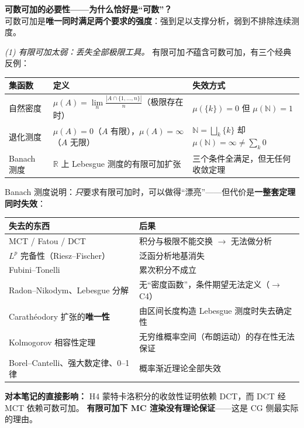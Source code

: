 \textbf{可数可加的必要性——为什么恰好是“可数”？}\\
可数可加是\textbf{唯一同时满足两个要求的强度}：强到足以支撑分析，弱到不排除连续测度。

\textit{(1) 有限可加太弱：丢失全部极限工具。} 有限可加\emph{不}蕴含可数可加，有三个经典反例：

\begin{center}
\begin{tabular}{L{2.8cm}L{5.6cm}L{4.4cm}}
\toprule
\textbf{集函数} & \textbf{定义} & \textbf{失效方式} \\
\midrule
自然密度 & $\mu(A)=\lim\limits_{n}\frac{|A\cap\{1,\dots,n\}|}{n}$（极限存在时） &
$\mu(\{k\})=0$ 但 $\mu(\mathbb{N})=1$ \\
\addlinespace
退化测度 & $\mu(A)=0$（$A$ 有限），$\mu(A)=\infty$（$A$ 无限） &
$\mathbb{N}=\bigsqcup_k\{k\}$ 却 $\mu(\mathbb{N})=\infty \neq \sum_k 0$ \\
\addlinespace
Banach 测度 & $\mathbb{R}$ 上 Lebesgue 测度的有限可加扩张 &
三个条件全满足，但无任何收敛定理 \\
\bottomrule
\end{tabular}
\end{center}

Banach 测度说明：\emph{只}要求有限可加时，可以做得“漂亮”——但代价是\textbf{一整套定理同时失效}：

\begin{center}
\begin{tabular}{L{5.2cm}L{7.8cm}}
\toprule
\textbf{失去的东西} & \textbf{后果} \\
\midrule
MCT / Fatou / DCT & 积分与极限不能交换 $\to$ 无法做分析 \\
$L^p$ 完备性（Riesz--Fischer） & 泛函分析地基消失 \\
Fubini--Tonelli & 累次积分不成立 \\
Radon--Nikodym、Lebesgue 分解 & 无“密度函数”，条件期望无法定义（$\to$ C4） \\
Carathéodory 扩张的\textbf{唯一性} & 由区间长度构造 Lebesgue 测度时失去确定性 \\
Kolmogorov 相容性定理 & 无穷维概率空间（布朗运动）的存在性无法保证 \\
Borel--Cantelli、强大数定律、0--1 律 & 概率渐近理论全部失效 \\
\bottomrule
\end{tabular}
\end{center}

\textbf{对本笔记的直接影响：} H4 蒙特卡洛积分的收敛性证明依赖 DCT，而 DCT 经 MCT 依赖可数可加。
\textbf{有限可加下 MC 渲染没有理论保证}——这是 CG 侧最实际的理由。

